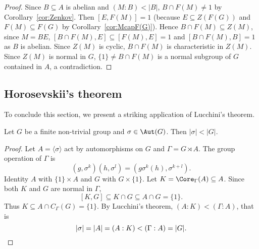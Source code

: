 \begin{proof}
	\medskip
	Since $B\subseteq A$ is abelian and $(M:B)<|B|$, $B\cap F(M)\ne1$ by Corollary~\ref{cor:Zenkov}. Then $[E,F(M)]=1$ (because $E\subseteq
	Z(F(G))$ and $F(M)\subseteq F(G)$ by Corollary~\ref{cor:McapF(G)}).
	Hence $B\cap F(M)\subseteq Z(M)$, since $M=BE$, $[B\cap F(M),E]\subseteq
	[F(M),E]=1$ and $[B\cap F(M),B]=1$ as $B$ is abelian. Since 
	$Z(M)$ is cyclic, $B\cap F(M)$ is characteristic in $Z(M)$. Since 
	$Z(M)$ is normal in $G$, $\{1\}\ne B\cap F(M)$ is a normal subgroup of $G$
	contained in $A$, a contradiction. 
\end{proof}

\subsection{Horosevskii's theorem}

To conclude this section, we present a striking application of Lucchini's theorem.

\begin{corollary}[Horosevskii]
	Let $G$ be a finite non-trivial group and $\sigma\in\Aut(G)$. Then 
	$|\sigma|<|G|$.
\end{corollary}

\begin{proof}
	Let $A=\langle\sigma\rangle$ act by automorphisms on $G$ and 
	 $\Gamma=G\rtimes A$. The group operation of $\Gamma$ is 
	\[
	(g,\sigma^k)(h,\sigma^l)=(g\sigma^k(h),\sigma^{k+l}).
	\]
	Identity $A$ with $\{1\}\times A$ and $G$ with $G\times\{1\}$.
    Let $K=\Core_\Gamma(A)\subseteq A$. 
    Since both $K$ and $G$ are normal in $\Gamma$, 
    \[ 
    [K,G]\subseteq K\cap G\subseteq A\cap G=\{1\}.
    \]
    Thus  
    $K\subseteq A\cap C_\Gamma(G)=\{1\}$.
    By Lucchini's theorem, 
    $(A:K)<(\Gamma:A)$, that is
	\[
		|\sigma|=|A|=(A:K)<(\Gamma:A)=|G|.\qedhere
	\]
\end{proof}
